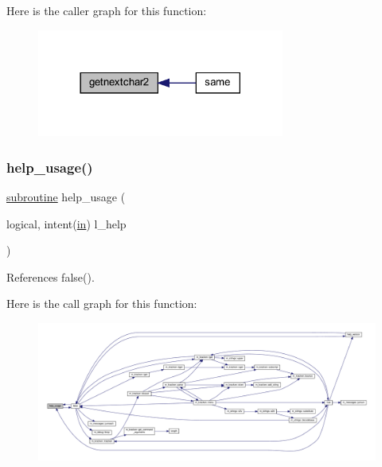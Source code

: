 Here is the caller graph for this function\+:
\nopagebreak
\begin{figure}[H]
\begin{center}
\leavevmode
\includegraphics[width=230pt]{__cmp_8f90_acbf875fdb593609438c33f5b8182e7d4_icgraph}
\end{center}
\end{figure}
\mbox{\label{__cmp_8f90_a3e09a3b52ee8fb04eeb93fe5761626a8}} 
\subsubsection{\texorpdfstring{help\+\_\+usage()}{help\_usage()}}
{\footnotesize\ttfamily \hyperlink{M__stopwatch_83_8txt_acfbcff50169d691ff02d4a123ed70482}{subroutine} help\+\_\+usage (\begin{DoxyParamCaption}\item[{logical, intent(\hyperlink{M__journal_83_8txt_afce72651d1eed785a2132bee863b2f38}{in})}]{l\+\_\+help }\end{DoxyParamCaption})}



References false().

Here is the call graph for this function\+:
\nopagebreak
\begin{figure}[H]
\begin{center}
\leavevmode
\includegraphics[width=350pt]{__cmp_8f90_a3e09a3b52ee8fb04eeb93fe5761626a8_cgraph}
\end{center}
\end{figure}
\mbox{\label{__cmp_8f90_a39c21619b08a3c22f19e2306efd7f766}} 

